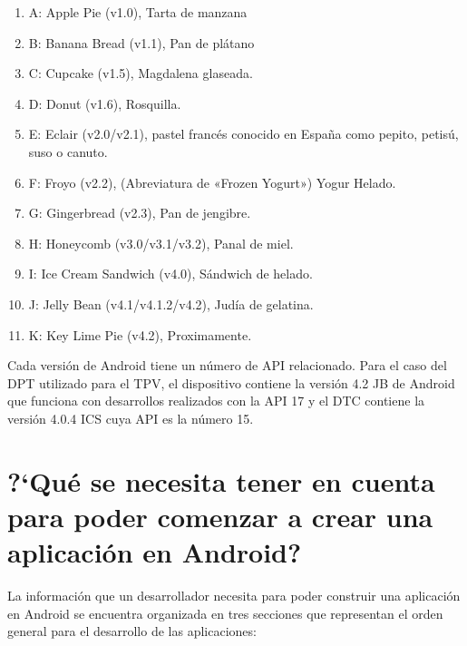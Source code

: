\begin{enumerate}
\item A: Apple Pie (v1.0), Tarta de manzana
\item B: Banana Bread (v1.1), Pan de pl\'atano
\item C: Cupcake (v1.5), Magdalena glaseada.
\item D: Donut (v1.6), Rosquilla.
\item E: Eclair (v2.0/v2.1), pastel franc\'es conocido en Espa\~na como pepito, petis\'u, suso o canuto.
\item F: Froyo (v2.2), (Abreviatura de «Frozen Yogurt») Yogur Helado.
\item G: Gingerbread (v2.3), Pan de jengibre.
\item H: Honeycomb (v3.0/v3.1/v3.2), Panal de miel.
\item I: Ice Cream Sandwich (v4.0), S\'andwich de helado.
\item J: Jelly Bean (v4.1/v4.1.2/v4.2), Jud\'ia de gelatina.
\item K: Key Lime Pie (v4.2), Proximamente.
\end{enumerate}


Cada versi\'on de Android tiene un n\'umero de \ac{API} relacionado. Para el caso del \ac{DPT} utilizado para el \ac{TPV}, el dispositivo contiene la versi\'on 4.2 \ac{JB} de Android que funciona con desarrollos realizados con la \ac{API} 17 y el \ac{DTC} contiene la versi\'on 4.0.4 \ac{ICS} cuya \ac{API} es la n\'umero 15.

\section{?`Qu\'e se necesita tener en cuenta para poder comenzar a crear una aplicaci\'on en Android?}
\label{sec:android.whatYouNeed.1}

La informaci\'on que un desarrollador necesita para poder construir una aplicaci\'on en Android se encuentra organizada en tres secciones que representan el orden general para el desarrollo de las aplicaciones:

